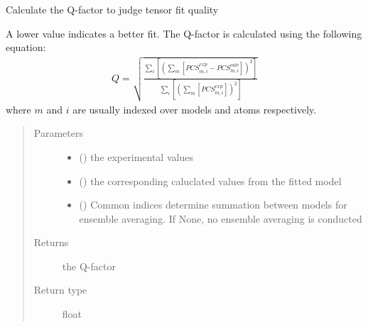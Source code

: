 \documentclass[a4paper,10pt,english,openany,oneside]{sphinxmanual}
\begin{document}
\begin{fulllineitems}
\label{\detokenize{reference/generated/paramagpy.fit.qfactor:paramagpy.fit.qfactor}}
Calculate the Q-factor to judge tensor fit quality

A lower value indicates a better fit. The Q-factor is calculated using
the following equation:
\begin{equation*}
\begin{split}Q = \sqrt{
        \frac{\sum_i\left[\left(\sum_m\left[
        PCS^{exp}_{m,i}-PCS^{calc}_{m,i}\right]\right)^2\right]}
        {\sum_i\left[
        \left(\sum_m\left[PCS^{exp}_{m,i}\right]\right)^2\right]}
}\end{split}
\end{equation*}
where \(m\) and \(i\) are usually indexed over models and atoms
respectively.
\begin{quote}\begin{description}
\item[{Parameters}] \leavevmode\begin{itemize}
\item {} 
 () \textendash{} the experimental values

\item {} 
 () \textendash{} the corresponding caluclated values from the fitted model

\item {} 
 (\sphinxstyleliteralemphasis{\sphinxupquote{, }}) \textendash{} Common indices determine summation between models
for ensemble averaging.
If None, no ensemble averaging is conducted

\end{itemize}

\item[{Returns}] \leavevmode
{} \textendash{} the Q-factor

\item[{Return type}] \leavevmode
float

\end{description}\end{quote}

\end{fulllineitems}
\end{document}
